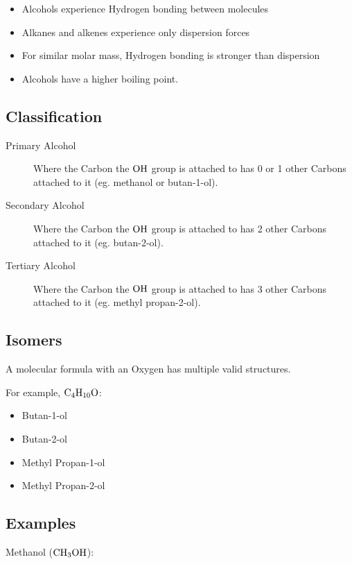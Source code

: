 \documentclass[a4paper,11pt]{article}
\begin{document}
\begin{itemize}
\item Alcohols experience Hydrogen bonding between molecules
\item Alkanes and alkenes experience only dispersion forces
\item For similar molar mass, Hydrogen bonding is stronger than dispersion
\item Alcohols have a higher boiling point.
\end{itemize}


\subsection{Classification}

\begin{description}
\item [Primary Alcohol] Where the Carbon the $\ce{OH}$ group is attached to
	has 0 or 1 other Carbons attached to it (eg. methanol or butan-1-ol).
\item [Secondary Alcohol] Where the Carbon the $\ce{OH}$ group is attached to
	has 2 other Carbons attached to it (eg. butan-2-ol).
\item [Tertiary Alcohol] Where the Carbon the $\ce{OH}$ group is attached to
	has 3 other Carbons attached to it (eg. methyl propan-2-ol).
\end{description}


\subsection{Isomers}

A molecular formula with an Oxygen has multiple valid structures.

For example, $\ce{C4H10O}$:

\begin{itemize}
\item Butan-1-ol
\item Butan-2-ol
\item Methyl Propan-1-ol
\item Methyl Propan-2-ol
\end{itemize}


\subsection{Examples}

Methanol ($\ce{CH3OH}$):

\begin{center}
\end{center}
\end{document}
